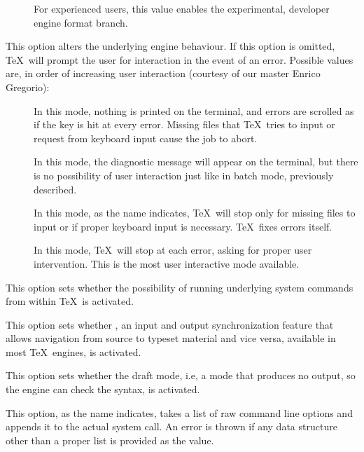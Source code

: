 \begin{description}
\begin{description}
\begin{description}
\item[] For experienced users, this value enables the experimental, developer engine format branch.
\end{description}

\item[\abox{interaction}] This option alters the underlying engine behaviour. If this option is omitted, \TeX\ will prompt the user for interaction in the event of an error. Possible values are, in order of increasing user interaction (courtesy of our master Enrico Gregorio):

\begin{description}
\item[] In this mode, nothing is printed on the terminal, and errors are scrolled as if the  key is hit at every error. Missing files that \TeX\ tries to input or request from keyboard input cause the job to abort.

\item[] In this mode, the diagnostic message will appear on the terminal, but there is no possibility of user interaction just like in batch mode, previously described.

\item[] In this mode, as the name indicates, \TeX\ will stop only for missing files to input or if proper keyboard input is necessary. \TeX\ fixes errors itself.

\item[] In this mode, \TeX\ will stop at each error, asking for proper user intervention. This is the most user interactive mode available.
\end{description}

\item[\rpsbox{shell}] This option sets whether the possibility of running underlying system commands from within \TeX\ is activated.

\item[\rpsbox{synctex}] This option sets whether , an input and output synchronization feature that allows navigation from source to typeset material and vice versa, available in most \TeX\ engines, is activated.

\item[\rpsbox{draft}] This option sets whether the draft mode, i.e, a mode that produces no output, so the engine can check the syntax, is activated.

\item[\abox{options}] This option, as the name indicates, takes a list of raw command line options and appends it to the actual system call. An error is thrown if any data structure other than a proper list is provided as the value.
\end{description}


\end{description}
